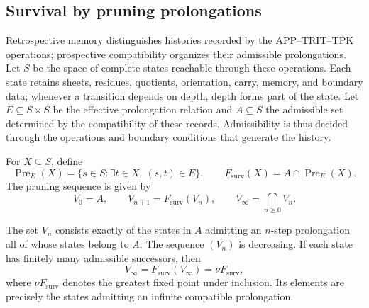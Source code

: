 \subsection{Survival by pruning prolongations}
\label{hmtfg:base:corpus9:xi:supervivencia}

Retrospective memory distinguishes histories recorded by the
APP--TRIT--TPK operations; prospective compatibility organizes their
admissible prolongations. Let \(S\) be the space of complete states
reachable through these operations. Each state retains sheets, residues,
quotients, orientation, carry, memory, and boundary data; whenever a
transition depends on depth, depth forms part of the state.
Let \(E\subseteq S\times S\) be the effective prolongation relation and
\(A\subseteq S\) the admissible set determined by the compatibility of
these records. Admissibility is thus decided through the operations and
boundary conditions that generate the history.

For \(X\subseteq S\), define
\begin{equation}
 \operatorname{Pre}_{E}(X)
 =\{s\in S:\exists t\in X,\ (s,t)\in E\},
 \qquad
 F_{\mathrm{surv}}(X)=A\cap\operatorname{Pre}_{E}(X).
 \label{hmtfg:base:corpus9:xi:operador-poda}
\end{equation}
The pruning sequence is given by
\begin{equation}
 V_0=A,\qquad
 V_{n+1}=F_{\mathrm{surv}}(V_n),\qquad
 V_\infty=\bigcap_{n\geq0}V_n.
 \label{hmtfg:base:corpus9:xi:sucesion-poda}
\end{equation}

\begin{proposition}
\label{hmtfg:base:corpus9:xi:mayor-punto-fijo}
The set \(V_n\) consists exactly of the states in \(A\) admitting an
\(n\)-step prolongation all of whose states belong to \(A\). The
sequence \((V_n)\) is decreasing. If each state has finitely many
admissible successors, then
\[
 V_\infty=F_{\mathrm{surv}}(V_\infty)
          =\nu F_{\mathrm{surv}},
\]
where \(\nu F_{\mathrm{surv}}\) denotes the greatest fixed point under
inclusion. Its elements are precisely the states admitting an infinite
compatible prolongation.
\end{proposition}

